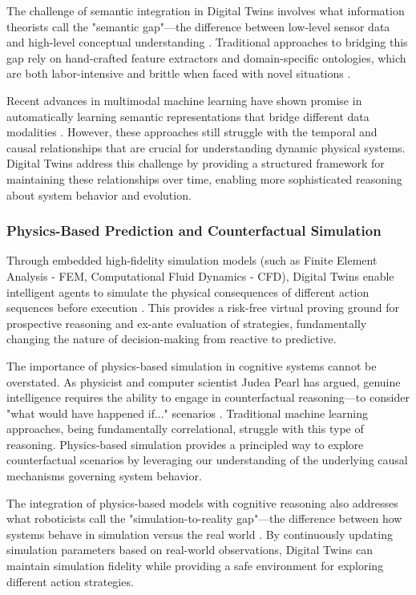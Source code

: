 The challenge of semantic integration in Digital Twins involves what information theorists call the "semantic gap"—the difference between low-level sensor data and high-level conceptual understanding \cite{smeulders2000content, datta2008image}. Traditional approaches to bridging this gap rely on hand-crafted feature extractors and domain-specific ontologies, which are both labor-intensive and brittle when faced with novel situations \cite{gruber1993translation, studer1998knowledge}.

Recent advances in multimodal machine learning have shown promise in automatically learning semantic representations that bridge different data modalities \cite{baltrusaitis2018multimodal, ramesh2021zero}. However, these approaches still struggle with the temporal and causal relationships that are crucial for understanding dynamic physical systems. Digital Twins address this challenge by providing a structured framework for maintaining these relationships over time, enabling more sophisticated reasoning about system behavior and evolution.

\subsubsection{Physics-Based Prediction and Counterfactual Simulation}

Through embedded high-fidelity simulation models (such as Finite Element Analysis - FEM, Computational Fluid Dynamics - CFD), Digital Twins enable intelligent agents to simulate the physical consequences of different action sequences before execution \cite{negri2017review, kritzinger2018digital}. This provides a risk-free virtual proving ground for prospective reasoning and ex-ante evaluation of strategies, fundamentally changing the nature of decision-making from reactive to predictive.

The importance of physics-based simulation in cognitive systems cannot be overstated. As physicist and computer scientist Judea Pearl has argued, genuine intelligence requires the ability to engage in counterfactual reasoning—to consider "what would have happened if..." scenarios \cite{pearl2019seven}. Traditional machine learning approaches, being fundamentally correlational, struggle with this type of reasoning. Physics-based simulation provides a principled way to explore counterfactual scenarios by leveraging our understanding of the underlying causal mechanisms governing system behavior.

The integration of physics-based models with cognitive reasoning also addresses what roboticists call the "simulation-to-reality gap"—the difference between how systems behave in simulation versus the real world \cite{zhao2020sim, peng2018sim}. By continuously updating simulation parameters based on real-world observations, Digital Twins can maintain simulation fidelity while providing a safe environment for exploring different action strategies.

